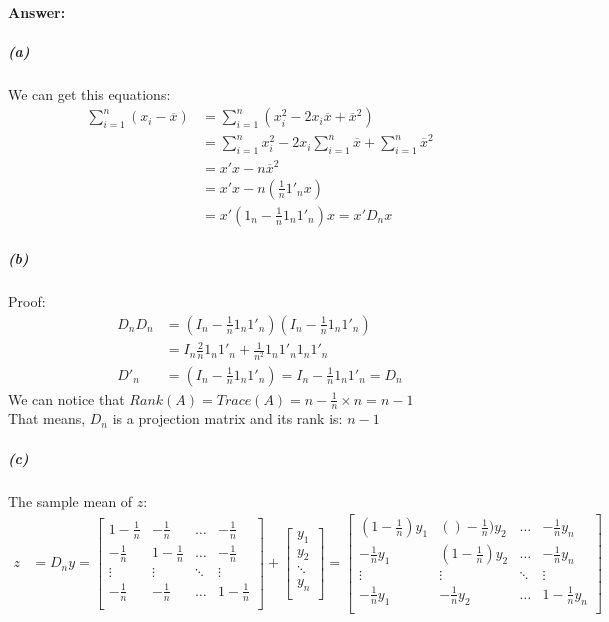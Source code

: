 \documentclass[UTF8]{article}
\begin{document}
\paragraph{Answer:}
  \subparagraph{(a)}
    We can get this equations: \\
    \begin{align*}
      \sum^n_{i=1}(x_i - \overline{x}) &= \sum^n_{i=1}(x_i^2 - 2x_i \overline{x} + \overline{x}^2) \\
      & = \sum^n_{i=1}x_i^2 - 2x_i\sum^n_{i=1}\overline{x} + \sum^n_{i=1} \overline{x}^2 \\
      & = x'x - n\overline{x}^2 \\
      & = x'x - n(\frac{1}{n}1'_nx) \\
      & = x'(1_n -\frac{1}{n}1_n1'_n)x = x'D_nx
    \end{align*}
  \subparagraph{(b)}
  Proof: \\
    \begin{align*}
      D_nD_n &= (I_n -\frac{1}{n}1_n 1'_n)(I_n -\frac{1}{n}1_n 1'_n) \\
             &= I_n \frac{2}{n}1_n1'_n +\frac{1}{n^2}1_n1'_n1_n1'_n \\
      D'_n   &= (I_n - \frac{1}{n}1_n1'_n) = I_n - \frac{1}{n}1_n1'_n = D_n
    \end{align*}
  We can notice that $Rank(A) = Trace(A) = n - \frac{1}{n} \times n = n - 1$ \\
  That means, $D_n$ is a projection matrix and its rank is: $n - 1$
  \subparagraph{(c)}
    The sample mean of $z$:
    \begin{align*}
      z &= D_ny =
      \begin{bmatrix}
        1-\frac{1}{n} & -\frac{1}{n} & \dots &-\frac{1}{n} \\
        -\frac{1}{n} & 1-\frac{1}{n} & \dots & -\frac{1}{n} \\
        \vdots & \vdots & \ddots & \vdots \\
        -\frac{1}{n} & -\frac{1}{n} &\dots & 1-\frac{1}{n} \\
      \end{bmatrix}
       +
      \begin{bmatrix}
        y_1 \\
        y_2 \\
        \ddots \\
        y_n \\
      \end{bmatrix} =
      \begin{bmatrix}
        (1-\frac{1}{n})y_1 & ()-\frac{1}{n})y_2 & \dots & -\frac{1}{n}y_n \\
        -\frac{1}{n}y_1 & (1-\frac{1}{n})y_2 & \dots & -\frac{1}{n}y_n  \\
        \vdots & \vdots & \ddots & \vdots \\
        -\frac{1}{n}y_1 & -\frac{1}{n}y_2 &\dots & 1-\frac{1}{n}y_n  \\
      \end{bmatrix}
    \end{align*}
\end{document}
